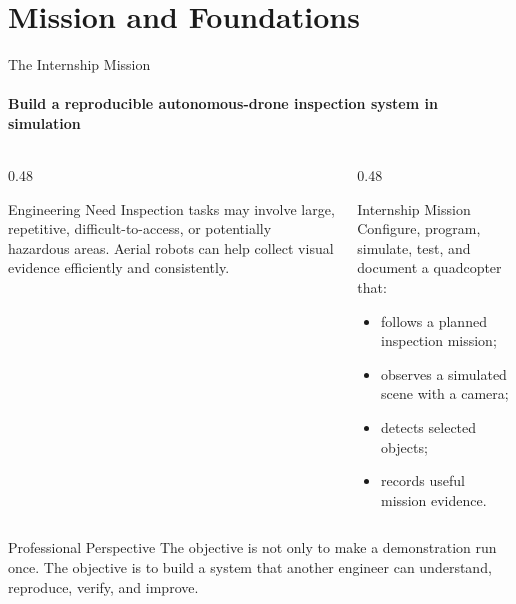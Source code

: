\section{Mission and Foundations}

\begin{frame}{The Internship Mission}
\framesubtitle{Build a reproducible autonomous-drone inspection system in simulation}
\footnotesize
\begin{columns}[T,onlytextwidth]
    \begin{column}{0.48\textwidth}
        \begin{block}{Engineering Need}
            Inspection tasks may involve large, repetitive, difficult-to-access,
            or potentially hazardous areas. Aerial robots can help collect
            visual evidence efficiently and consistently.
        \end{block}
    \end{column}
    \pause
    \begin{column}{0.48\textwidth}
        \begin{exampleblock}{Internship Mission}
            Configure, program, simulate, test, and document a quadcopter that:
            \begin{itemize}
                \setlength{\itemsep}{0.22em}
                \item follows a planned inspection mission;
                \item observes a simulated scene with a camera;
                \item detects selected objects;
                \item records useful mission evidence.
            \end{itemize}
        \end{exampleblock}
    \end{column}
\end{columns}
\begin{alertblock}{Professional Perspective}
The objective is not only to make a demonstration run once. The objective is to build a system that another engineer can understand, reproduce, verify, and improve.
\end{alertblock}
\end{frame}


